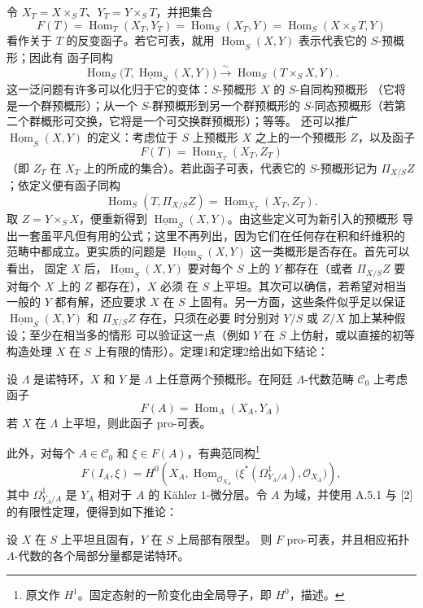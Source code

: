 令 $X_T=X\times_ST$、$Y_T=Y\times_ST$，并把集合
\[
  F(T)=\operatorname{Hom}_T(X_T,Y_T)
      =\operatorname{Hom}_S(X_T,Y)
      =\operatorname{Hom}_S(X\times_ST,Y)
\]
看作关于 $T$ 的反变函子。若它可表，就用
$\underline{\operatorname{Hom}}_S(X,Y)$ 表示代表它的 $S$-预概形；因此有
函子同构
\[
  \operatorname{Hom}_S
  \bigl(T,\underline{\operatorname{Hom}}_S(X,Y)\bigr)
  \xrightarrow{\sim}
  \operatorname{Hom}_S(T\times_SX,Y).
\]
这一泛问题有许多可以化归于它的变体：$S$-预概形 $X$ 的 $S$-自同构预概形
（它将是一个群预概形）；从一个 $S$-群预概形到另一个群预概形的
$S$-同态预概形（若第二个群概形可交换，它将是一个可交换群预概形）；等等。
还可以推广 $\underline{\operatorname{Hom}}_S(X,Y)$ 的定义：考虑位于
$S$ 上预概形 $X$ 之上的一个预概形 $Z$，以及函子
\[
  F(T)=\operatorname{Hom}_{X_T}(X_T,Z_T)
\]
（即 $Z_T$ 在 $X_T$ 上的所成的集合）。若此函子可表，代表它的
$S$-预概形记为 $\Pi_{X/S}Z$；依定义便有函子同构
\[
  \operatorname{Hom}_S(T,\Pi_{X/S}Z)
  =\operatorname{Hom}_{X_T}(X_T,Z_T).
\]
取 $Z=Y\times_SX$，便重新得到
$\underline{\operatorname{Hom}}_S(X,Y)$。由这些定义可为新引入的预概形
导出一套虽平凡但有用的公式；这里不再列出，因为它们在任何存在积和纤维积的
范畴中都成立。更实质的问题是
$\underline{\operatorname{Hom}}_S(X,Y)$ 这一类概形是否存在。首先可以看出，
固定 $X$ 后，$\underline{\operatorname{Hom}}_S(X,Y)$ 要对每个 $S$ 上的
$Y$ 都存在（或者 $\Pi_{X/S}Z$ 要对每个 $X$ 上的 $Z$ 都存在），$X$ 必须
在 $S$ 上平坦。其次可以确信，若希望对相当一般的 $Y$ 都有解，还应要求 $X$
在 $S$ 上固有。另一方面，这些条件似乎足以保证
$\underline{\operatorname{Hom}}_S(X,Y)$ 和 $\Pi_{X/S}Z$ 存在，只须在必要
时分别对 $Y/S$ 或 $Z/X$ 加上某种假设；至少在相当多的情形
可以验证这一点（例如 $Y$ 在 $S$ 上仿射，或以直接的初等构造处理 $X$ 在
$S$ 上有限的情形）。定理1和定理2给出如下结论：

 设 $\Lambda$ 是诺特环，$X$ 和 $Y$ 是
$\Lambda$ 上任意两个预概形。在阿廷 $\Lambda$-代数范畴
$\mathcal C_0$ 上考虑函子
\[
  F(A)=\operatorname{Hom}_A(X_A,Y_A)
\]
若 $X$ 在 $\Lambda$ 上平坦，则此函子 pro-可表。

此外，对每个 $A\in\mathcal C_0$ 和 $\xi\in F(A)$，有典范同构\footnote{原文作 $H^1$。固定态射的一阶变化由全局导子，即 $H^0$，描述。}
\[
  F(I_A,\xi)=H^0\!\left(
    X_A,
    \underline{\operatorname{Hom}}_{\mathcal O_{X_A}}
    \bigl(\xi^*(\Omega^1_{Y_A/A}),\mathcal O_{X_A}\bigr)
  \right),
\]
其中 $\Omega^1_{Y_A/A}$ 是 $Y_A$ 相对于 $A$ 的 Kähler $1$-微分层。令
$A$ 为域，并使用 A.5.1 与 [2] 的有限性定理，便得到如下推论：

 设 $X$ 在 $S$ 上平坦且固有，$Y$ 在 $S$ 上局部有限型。
则 $F$ pro-可表，并且相应拓扑 $\Lambda$-代数的各个局部分量都是诺特环。

